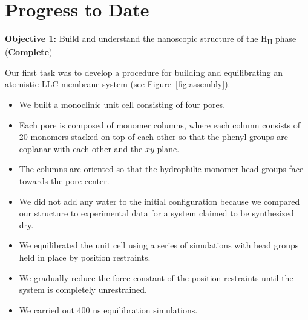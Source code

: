 \documentclass{article}
\begin{document}
\begin{enumerate}
%    
    
  \end{enumerate}

  \section{Progress to Date}\label{section:progress}
  
  \textbf{\large Objective 1:} {\large Build and understand the nanoscopic structure
  of the H\textsubscript{II} phase} (\textcolor{green!40!olive}{\textbf{Complete}})
  
  \noindent Our first task was to develop a procedure for building and equilibrating 
  an atomistic LLC membrane system (see Figure~\ref{fig:assembly}).
  \begin{itemize}
    \item We built a monoclinic unit cell consisting of four pores.
    \item Each pore is composed of monomer columns, where each column
    consists of 20 monomers stacked on top of each other so that the 
    phenyl groups are coplanar with each other and the $xy$ plane. 
    \item The columns are oriented so that the hydrophilic monomer head
    groups face towards the pore center.
    \item We did not add any water to the initial configuration because we
    compared our structure to experimental data for a system claimed to be
    synthesized dry.
    \item We equilibrated the unit cell using a series of simulations
    with head groups held in place by position restraints. 
    \item We gradually reduce the force constant of the position 
    restraints until the system is completely unrestrained.
    \item We carried out 400 ns equilibration simulations.

  \end{itemize}
  
\end{document}
